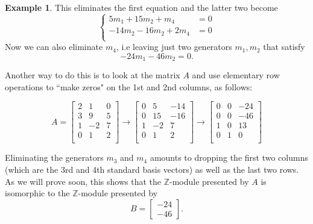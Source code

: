 \documentclass[12pt]{report}
\numberwithin{equation}{section}
\numberwithin{theorem}{chapter}
\theoremstyle{definition}
\newtheorem{example}[theorem]{Example}
\newtheorem*{basic properties}{Basic Properties}
\newtheorem*{Important Remark}{Important Remark}
\begin{document}
\begin{example}
This eliminates the first equation and the latter two become
$$
\begin{cases}
5m_1 + 15m_2 + m_4 & = 0 \\
-14m_2  -16m_2 + 2m_4 & = 0 \\
\end{cases}
$$
Now we can also eliminate $m_4$, i.e  leaving just two generators $m_1, m_2$ that satisfy
$$
-24m_1 -46m_2 = 0.
$$

Another way to do this is to look at the matrix $A$ and use elementary row operations to ``make zeros" on the 1st and 2nd columns, as follows:

$$
A =
\begin{bmatrix}
2 & 1 & 0 \\
3 & 9 & 5 \\
1 & -2 & 7 \\
0 & 1 & 2 \\
\end{bmatrix}
\rightarrow
\begin{bmatrix}
0 & 5 & -14 \\
0 & 15 & -16 \\
1 & -2 & 7 \\
0 & 1 & 2 \\
\end{bmatrix}
\rightarrow
\begin{bmatrix}
0 & 0 & -24 \\
0 & 0 & -46 \\
1 & 0 & 13\\
0 & 1 & 0 \\
\end{bmatrix}
$$

Eliminating the generators $m_3$ and $m_4$ amounts to dropping the first two columns (which are the 3rd and 4th standard basis vectors) as well as the last two rows. As we will prove soon, this shows that the $\mathbb{Z}$-module presented by $A$ is  isomorphic to the $\mathbb{Z}$-module presented by
$$
B=
\begin{bmatrix} -24 \\ - 46
\end{bmatrix}.
$$




\end{example}
\end{document}
